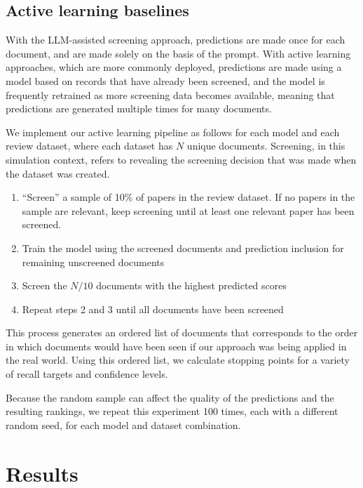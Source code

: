\documentclass{article}
\begin{document}
	\subsection*{Active learning baselines}
	
	With the LLM-assisted screening approach, predictions are made once for each document, and are made solely on the basis of the prompt. With active learning approaches, which are more commonly deployed, predictions are made using a model based on records that have already been screened, and the model is frequently retrained as more screening data becomes available, meaning that predictions are generated multiple times for many documents.
	
	We implement our active learning pipeline as follows for each model and each review dataset, where each dataset has $N$ unique documents. Screening, in this simulation context, refers to revealing the screening decision that was made when the dataset was created.
	
	\begin{enumerate}
		\item ``Screen'' a sample of 10\% of papers in the review dataset. If no papers in the sample are relevant, keep screening until at least one relevant paper has been screened.
		\item Train the model using the screened documents and prediction inclusion for remaining unscreened documents
		\item Screen the $N/10$ documents with the highest predicted scores 
		\item Repeat steps 2 and 3 until all documents have been screened
	\end{enumerate}

	This process generates an ordered list of documents that corresponds to the order in which documents would have been seen if our approach was being applied in the real world. Using this ordered list, we calculate stopping points for a variety of recall targets and confidence levels.
	
	Because the random sample can affect the quality of the predictions and the resulting rankings, we repeat this experiment 100 times, each with a different random seed, for each model and dataset combination. 
	
	\section*{Results}
	
\end{document}
